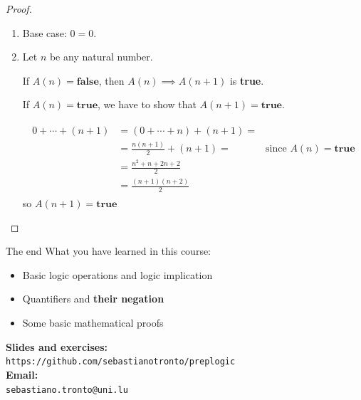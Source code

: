 \documentclass[11pt]{beamer}
\makeatletter
\theoremstyle{definition}
\newcommand{\refgithub}{
    \textbf{Slides and exercises:} \\
    \hspace{20pt}\texttt{https://github.com/sebastianotronto/preplogic} \\
    \textbf{Email:} \\
    \hspace{20pt}\texttt{sebastiano.tronto@uni.lu}
}
\makeatother
\begin{document}
\begin{frame}
  \begin{proof}
  \begin{enumerate}
  \item Base case: $0=0$.
    \pause
  \item Let $n$ be any natural number.
    \pause
      
      If $A(n)=\textbf{false}$, then $A(n)\implies A(n+1)$ is \textbf{true}.
      \pause

      If $A(n)=\textbf{true}$, we have to show that $A(n+1)=\textbf{true}$.
      \pause
      
      \begin{align*}
        \begin{array}{rlr}
          0+\cdots +(n+1)& = (0+\cdots+ n)+(n+1)=\\
          & = \frac{n(n+1)}{2}+(n+1)= & \text{since }A(n)=\textbf{true}\\
          & = \frac{n^2+n+2n+2}{2}\\
          & = \frac{(n+1)(n+2)}{2}
        \end{array}
      \end{align*}
      so $A(n+1)=\textbf{true}$

  \end{enumerate}
  \end{proof}
\end{frame}

\begin{frame}{The end}
  What you have learned in this course:
  \begin{itemize}
    \item Basic logic operations and logic implication
    \item Quantifiers and \textbf{their negation}
    \item Some basic mathematical proofs
  \end{itemize}
  \vspace{10pt}
  \refgithub
\end{frame}
\end{document}
